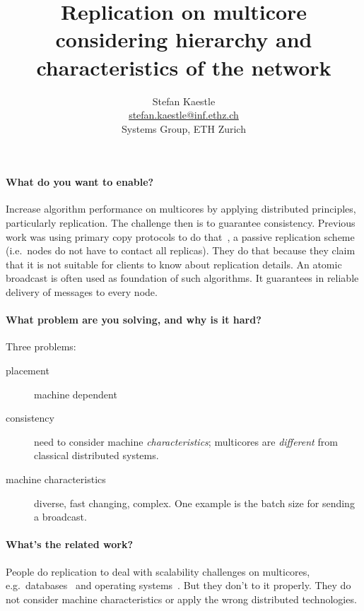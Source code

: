 \documentclass{article}
\begin{document}
\title{Replication on multicore considering hierarchy and
  characteristics of the network}

\newcommand{\eaddr}{stefan.kaestle@inf.ethz.ch}
\newcommand{\email}{\href{mailto:\eaddr}{\eaddr}}

\author{Stefan Kaestle\\
  \email \\
  Systems Group, ETH Zurich}

\maketitle

\paragraph{What do you want to enable?} Increase algorithm performance
on multicores by applying distributed principles, particularly
replication. The challenge then is to guarantee consistency. Previous
work was using primary copy protocols to do that~\cite{Wiesmann2000}, a
passive replication scheme (i.e.\ nodes do not have to contact all
replicas). They do that because they claim that it is not suitable for
clients to know about replication details. An atomic broadcast is
often used as foundation of such algorithms. It guarantees in reliable
delivery of messages to every node.

\paragraph{What problem are you solving, and why is it hard?} Three problems:
\begin{description}
\item[placement] machine dependent
\item[consistency] need to consider machine \emph{characteristics};
  multicores are \emph{different} from classical distributed systems.
\item[machine characteristics] diverse, fast changing, complex. One
  example is the batch size for sending a broadcast.
\end{description}

\paragraph{What's the related work?} People do replication to deal
with scalability challenges on multicores, e.g.\
databases~\cite{Salomie2011, Wiesmann2000} and operating
systems~\cite{fos:osr09, tornado:osdi99, barrelfish:sosp09}. But they
don't to it properly. They do not consider machine characteristics or
apply the wrong distributed technologies.
\end{document}
